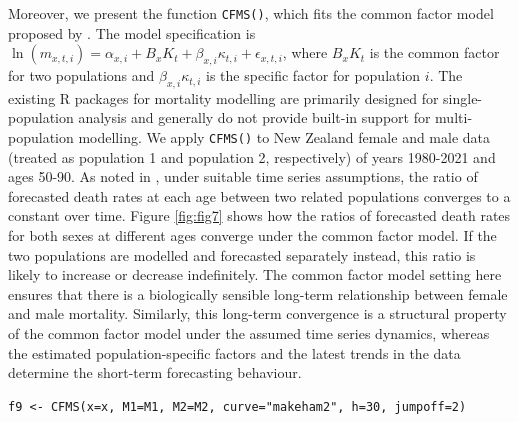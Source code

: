 Moreover, we present the function \texttt{CFMS()}, which fits the common factor model proposed by \citet{LiLee2005}. The model specification is \(\ln(m_{x,t,i}) = \alpha_{x,i} + B_x K_t + \beta_{x,i} \kappa_{t,i} + \epsilon_{x,t,i}\), where \(B_x K_t\) is the common factor for two populations and \(\beta_{x,i} \kappa_{t,i}\) is the specific factor for population \(i\). The existing R packages for mortality modelling are primarily designed for single-population analysis and generally do not provide built-in support for multi-population modelling. We apply \texttt{CFMS()} to New Zealand female and male data (treated as population 1 and population 2, respectively) of years 1980-2021 and ages 50-90. As noted in \citet{Li2013}, under suitable time series assumptions, the ratio of forecasted death rates at each age between two related populations converges to a constant over time. Figure \ref{fig:fig7} shows how the ratios of forecasted death rates for both sexes at different ages converge under the common factor model. If the two populations are modelled and forecasted separately instead, this ratio is likely to increase or decrease indefinitely. The common factor model setting here ensures that there is a biologically sensible long-term relationship between female and male mortality. Similarly, this long-term convergence is a structural property of the common factor model under the assumed time series dynamics, whereas the estimated population-specific factors and the latest trends in the data determine the short-term forecasting behaviour.

\begin{verbatim}
f9 <- CFMS(x=x, M1=M1, M2=M2, curve="makeham2", h=30, jumpoff=2)
\end{verbatim}

